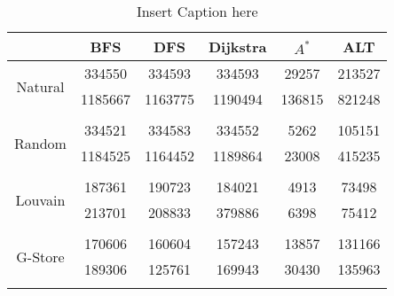\begin{table}
	\begin{center}
		 \begin{tabular}[c]{c c c c c c} \toprule
			  & BFS & DFS & Dijkstra & $A^*$  & ALT \\ \midrule 
 			\multirow{2}{*}{Natural}  & 334550 & 334593 & 334593 & 29257 & 213527 \\ 
 				 & 1185667 & 1163775 & 1190494 & 136815 & 821248 \\ 
 				&&&&& \\[-0.5em]
 			\multirow{2}{*}{Random}  & 334521 & 334583 & 334552 & 5262 & 105151 \\ 
 				 & 1184525 & 1164452 & 1189864 & 23008 & 415235 \\ 
 				&&&&& \\[-0.5em]
 			\multirow{2}{*}{Louvain}  & 187361 & 190723 & 184021 & 4913 & 73498 \\ 
 				 & 213701 & 208833 & 379886 & 6398 & 75412 \\ 
 				&&&&& \\[-0.5em]
 			\multirow{2}{*}{G-Store}  & 170606 & 160604 & 157243 & 13857 & 131166 \\ 
 				 & 189306 & 125761 & 169943 & 30430 & 135963 \\ 
 				&&&&& \\[-0.5em]
 					\end{tabular}  
  	 \end{center}
	 \caption{ Insert Caption here}
\end{table}